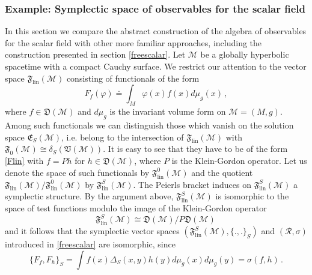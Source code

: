 \documentclass[11pt]{article}
\newcommand{\E}{\mathfrak{E}}
\newcommand{\V}{\mathfrak{V}}
\newcommand{\D}{\mathfrak{D}}
\newcommand{\F}{\mathfrak{F}}
\newcommand{\Mcal}{\mathcal{M}}
\newcommand{\Rcal}{\mathcal{R}}
\newcommand{\ph}{\varphi}
\newcommand{\1}{\mathds{1}}                         %
\newcommand{\be}{\begin{equation}}
\newcommand{\ee}{\end{equation}}
\begin{document}
{\subsubsection{Example: Symplectic space of observables for the scalar field}\label{symplectic}
In this section we compare the abstract construction of the algebra of observables for the scalar field with other more familiar approaches, including the construction presented in section \ref{freescalar}. Let $\Mcal$ be a globally hyperbolic spacetime with a compact Cauchy surface. We restrict our attention to the vector space $\F_{\textrm{lin}}(\Mcal)$ consisting of functionals of the form
\be\label{Flin}
F_f(\ph)\doteq \int_M \ph(x)f(x)d\mu_g(x)\,,
\ee
where $f\in\D(\Mcal)$ and $d\mu_g$ is the invariant volume form on $\Mcal=(M,g)$. Among such functionals we can distinguish those which vanish on the solution space $\E_S(\Mcal)$, i.e. belong to the intersection of $\F_{\textrm{lin}}(\Mcal)$ with $\F_0(\Mcal)\cong\delta_S(\V(\Mcal))$. It is easy to see that they have to be of the form \eqref{Flin} with $f=Ph$ for $h\in\D(\Mcal)$, where $P$ is the Klein-Gordon operator. Let us denote the space of such functionals by $\F^0_{\textrm{lin}}(\Mcal)$ and the quotient $\F_{\textrm{lin}}(\Mcal)/\F^0_{\textrm{lin}}(\Mcal)$ by $\F^S_{\textrm{lin}}(\Mcal)$. The Peierls bracket induces on $\F^S_{\textrm{lin}}(\Mcal)$ a symplectic structure. By the argument above, $\F^S_{\textrm{lin}}(\Mcal)$ is isomorphic to the space of test functions modulo the image of the Klein-Gordon operator 
\[
\F^S_{\textrm{lin}}(\Mcal) \cong \D(\Mcal) / P \D(\Mcal)\,
\]
and it follows that the symplectic vector spaces $(\F^S_{\textrm{lin}}(\Mcal),\{.,.\}_S)$ and $(\Rcal,\sigma)$ introduced in \ref{freescalar} are isomorphic, since
\[
\{F_f,F_{h}\}_S=\int f(x)\Delta_S(x,y)h(y)d\mu_g(x)d\mu_g(y)=\sigma(f,h) \,.
\]
}
\end{document}
